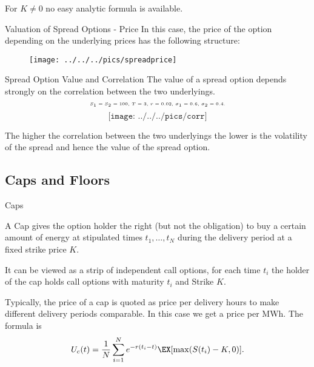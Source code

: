 For $K\neq 0$ no easy analytic formula is available.

{Valuation of Spread Options - Price}
In this case, the price of the option depending on the underlying prices has the following structure:
\begin{figure}
	\centering
		\texttt{[image: ../../../pics/spreadprice]}
	\label{fig:spreadprice}
\end{figure}

{Spread Option Value and Correlation}
The value of a spread option depends strongly on the correlation between the two underlyings.
$$\tiny\text{$S_1=S_2=100$, $T=3$, $r=0.02$, $\sigma_1=0.6$, $\sigma_2=0.4$.}$$
\vspace{-0.76cm}
$$\texttt{[image: ../../../pics/corr]}$$




\vspace{-1cm}


	The higher the correlation between the two underlyings the lower is the volatility of the spread and hence the value of the spread option.





\subsection{Caps and  Floors}

{Caps}






	
A Cap gives the option holder the right (but not the
obligation) to buy a certain amount of energy at stipulated times
$t_1,\ldots,t_N$ during the delivery period at a fixed strike
price $K$.


	
It can be viewed as a strip of
independent call options, for each time $t_i$ the holder of the cap holds call options with maturity $t_i$ and Strike $K$.


	
Typically, the price of a cap is quoted as price per delivery hours to make
different delivery periods comparable. In this case we get a price
per MWh. The formula is
$$U_c(t)=\frac{1}{N}\sum_{i=1}^Ne^{-r(t_i-t)}\EX[\max(S(t_i)-K,0)].$$





